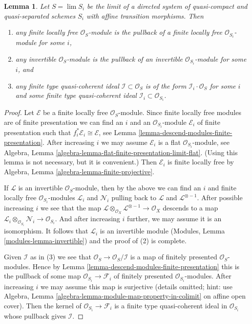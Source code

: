 \documentclass[10pt,a4paper]{amsart}
\theoremstyle{plain}
\newtheorem{lemma}[subsection]{Lemma}
\theoremstyle{definition}
\theoremstyle{remark}
\numberwithin{equation}{subsection}
\def\lim{\mathop{\mathrm{lim}}\nolimits}
\begin{document}
\begin{lemma}
\label{lemma-descend-invertible-modules}
Let $S = \lim S_i$ be the limit of a directed system of quasi-compact and
quasi-separated schemes $S_i$ with affine transition morphisms. Then
\begin{enumerate}
\item any finite locally free $\mathcal{O}_S$-module is the pullback
of a finite locally free $\mathcal{O}_{S_i}$-module for some $i$,
\item any invertible $\mathcal{O}_S$-module is the pullback of an invertible
$\mathcal{O}_{S_i}$-module for some $i$, and
\item any finite type quasi-coherent ideal $\mathcal{I} \subset \mathcal{O}_S$
is of the form $\mathcal{I}_i \cdot \mathcal{O}_S$ for some $i$ and some
finite type quasi-coherent ideal $\mathcal{I}_i \subset \mathcal{O}_{S_i}$.
\end{enumerate}
\end{lemma}

\begin{proof}
Let $\mathcal{E}$ be a finite locally free $\mathcal{O}_S$-module. Since
finite locally free modules are of finite presentation we can find an $i$
and an $\mathcal{O}_{S_i}$-module $\mathcal{E}_i$ of finite presentation
such that $f_i^*\mathcal{E}_i \cong \mathcal{E}$, see
Lemma \ref{lemma-descend-modules-finite-presentation}.
After increasing $i$ we may assume $\mathcal{E}_i$ is a flat
$\mathcal{O}_{S_i}$-module, see
Algebra, Lemma \ref{algebra-lemma-flat-finite-presentation-limit-flat}.
(Using this lemma is not necessary, but it is convenient.)
Then $\mathcal{E}_i$ is finite locally free by
Algebra, Lemma \ref{algebra-lemma-finite-projective}.

\medskip\noindent
If $\mathcal{L}$ is an invertible $\mathcal{O}_S$-module,
then by the above we can find an $i$ and finite locally
free $\mathcal{O}_{S_i}$-modules $\mathcal{L}_i$
and $\mathcal{N}_i$ pulling back to $\mathcal{L}$ and
$\mathcal{L}^{\otimes -1}$. After possible increasing
$i$ we see that the map
$\mathcal{L} \otimes_{\mathcal{O}_X} \mathcal{L}^{\otimes -1}
\to \mathcal{O}_X$ descends to a map
$\mathcal{L}_i \otimes_{\mathcal{O}_{S_i}} \mathcal{N}_i \to
\mathcal{O}_{S_i}$. And after increasing $i$ further, we
may assume it is an isomorphism. It follows that
$\mathcal{L}_i$ is an invertible module
(Modules, Lemma \ref{modules-lemma-invertible}) and
the proof of (2) is complete.

\medskip\noindent
Given $\mathcal{I}$ as in (3) we see that
$\mathcal{O}_S \to \mathcal{O}_S/\mathcal{I}$
is a map of finitely presented $\mathcal{O}_S$-modules.
Hence by Lemma \ref{lemma-descend-modules-finite-presentation}
this is the pullback of some
map $\mathcal{O}_{S_i} \to \mathcal{F}_i$ of finitely
presented $\mathcal{O}_{S_i}$-modules. After increasing $i$
we may assume this map is surjective (details omitted; hint: use
Algebra, Lemma \ref{algebra-lemma-module-map-property-in-colimit}
on affine open cover). Then the kernel of $\mathcal{O}_{S_i} \to \mathcal{F}_i$
is a finite type quasi-coherent ideal in $\mathcal{O}_{S_i}$
whose pullback gives $\mathcal{I}$.
\end{proof}
\end{document}
